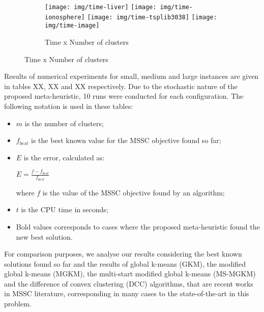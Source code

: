 \begin{figure}
	\begin{center}
		\begin{subfigure}{}
		\texttt{[image: img/time-liver]}\hfill
		\texttt{[image: img/time-ionosphere]}\hfill
		\texttt{[image: img/time-tsplib3038]}\hfill
		\texttt{[image: img/time-image]}\hfill
		\caption{Time x Number of clusters}
		\end{subfigure}\par\medskip
	\end{center}
\end{figure}

Results of numerical experiments for small, medium and large instances are given in tables XX, XX and XX respectively. Due to the stochastic nature of the proposed meta-heuristic, 10 runs were conducted for each configuration. The following notation is used in these tables:

\begin{itemize}

	\item $m$ is the number of clusters;

	\item $f_{best}$ is the best known value for the MSSC objective found so far;

	\item $E$ is the error, calculated as:

		\begin{center}
		\Large
			$E = \frac{f - f_{best}}{f_{best}}$
		\end{center}
		
	where $f$ is the value of the MSSC objective found by an algorithm;
	
	\item $t$ is the CPU time in seconds;

	\item Bold values corresponds to cases where the proposed meta-heuristic found the new best solution.

\end{itemize}

For comparison purposes, we analyse our results considering the best known solutions found so far and the results of global k-means (GKM), the modified global k-means (MGKM), the multi-start modified global k-means (MS-MGKM) and the difference of convex clustering (DCC) algorithms, that are recent works in MSSC literature, corresponding in many cases to the state-of-the-art in this problem.


